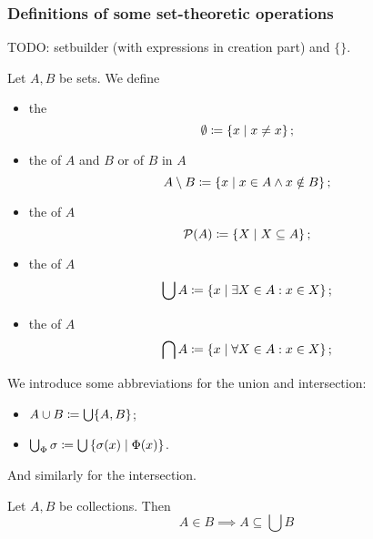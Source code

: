 \subsubsection{Definitions of some set-theoretic operations}
TODO: setbuilder (with expressions in creation part) and $\{\}$.
\begin{definition}
Let $A,B$ be sets. We define
\begin{itemize}
\item the 
\[ \emptyset \coloneqq \left\{ x \;\middle|\; x\neq x \right\}; \]
\item the  of $A$ and $B$ or  of $B$ in $A$
\[ A\setminus B \coloneqq \left\{ x \;\middle|\; x\in A \land x\notin B \right\}; \]
\item the  of $A$
\[ \operatorname{\mathcal{P}}(A) \coloneqq \left\{ X \;\middle|\; X\subseteq A \right\}; \]
\item the  of $A$
\[ \bigcup A \coloneqq \left\{ x \;\middle|\; \exists X\in A: x\in X \right\}; \]
\item the  of $A$
\[ \bigcap A \coloneqq \left\{ x \;\middle|\; \forall X\in A: x\in X \right\}; \]
\end{itemize}
We introduce some abbreviations for the union and intersection:
\begin{itemize}
\item $A\cup B \coloneqq \bigcup\{A,B\}$;
\item $\bigcup_\Phi \sigma \coloneqq \bigcup\left\{ \sigma(x) \;\middle|\; \Phi(x) \right\}$.
\end{itemize}
And similarly for the intersection.
\end{definition}

\begin{lemma} \label{elementSubsetUnion}
Let $A,B$ be collections. Then
\[ A \in B \implies A\subseteq \bigcup B \]
\end{lemma}


